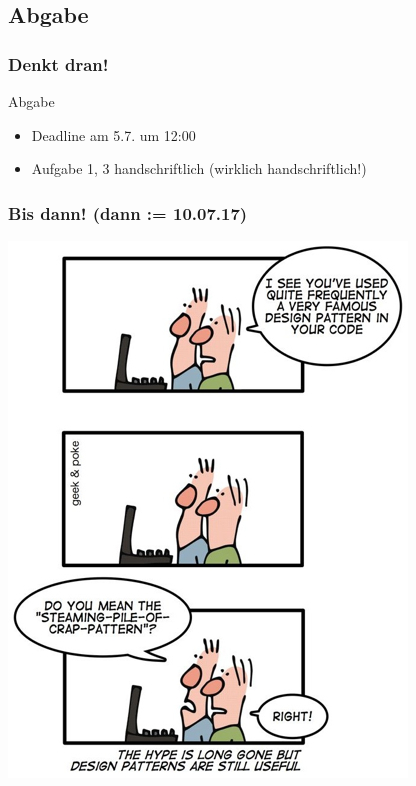 \documentclass[18pt]{beamer}
\begin{document}
	\subsection{Abgabe}
	\begin{frame}
		\frametitle{Denkt dran!}
		\begin{alertblock}{Abgabe}
			\begin{itemize}
				\item Deadline am 5.7. um 12:00
				\item Aufgabe 1, 3 handschriftlich (wirklich handschriftlich!)
			\end{itemize}
		\end{alertblock}
	\end{frame}
		
	\begin{frame}
		\frametitle{Bis dann! (dann  := 10.07.17)}
		\centering
		\includegraphics[scale=0.4]{./comics/patterns.jpg}
	\end{frame}
\end{document}
